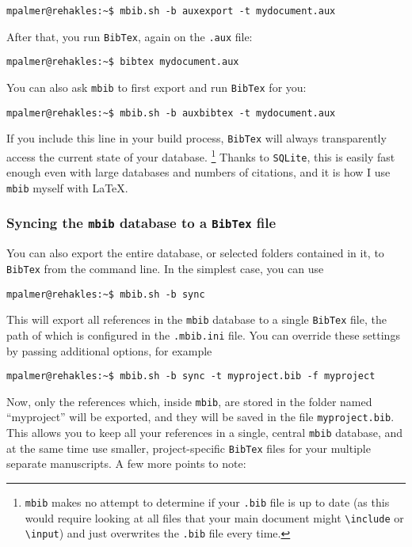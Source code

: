 \documentclass[10pt]{article}
\newcommand*{\mbib}{\texttt{mbib}\xspace}
\newcommand*{\bibtex}{\texttt{BibTex}\xspace}
\newcommand*{\sqlite}{\texttt{SQLite}\xspace}
\newcommand*{\ini}{\texttt{.mbib.ini}\xspace}
\begin{document}
\begin{verbatim}
mpalmer@rehakles:~$ mbib.sh -b auxexport -t mydocument.aux
\end{verbatim}

\noindent After that, you run \bibtex, again on the \texttt{.aux} file:

\begin{verbatim}
mpalmer@rehakles:~$ bibtex mydocument.aux
\end{verbatim}

\noindent You can also ask \mbib to first export and run \bibtex for you:

\begin{verbatim}
mpalmer@rehakles:~$ mbib.sh -b auxbibtex -t mydocument.aux
\end{verbatim}

\noindent If you include this line in your build process, \bibtex will always transparently access the current state of your database.%
%
\footnote{\mbib makes no attempt to determine if your \texttt{.bib} file is up to date (as this would require looking at all files that your main document might \texttt{\textbackslash include} or \texttt{\textbackslash input}) and just overwrites the \texttt{.bib} file every time.}
% 
Thanks to \sqlite, this is easily fast enough even with large databases and numbers of citations, and it is how I use \mbib myself with \LaTeX. 

\subsubsection{Syncing the \mbib database to a \bibtex file}

You can also export the entire database, or selected folders contained in it, to \bibtex from the command line. In the simplest case, you can use 

\begin{verbatim}
mpalmer@rehakles:~$ mbib.sh -b sync
\end{verbatim}

\noindent This will export all references in the \mbib database to a single \bibtex file, the path of which is configured in the \ini file. You can override these settings by passing additional options, for example 

\begin{verbatim}
mpalmer@rehakles:~$ mbib.sh -b sync -t myproject.bib -f myproject
\end{verbatim}

\noindent Now, only the references which, inside \mbib, are stored in the folder named ``myproject'' will be exported, and they will be saved in the file \texttt{myproject.bib}. This allows you to keep all your references in a single, central \mbib database, and at the same time use smaller, project-specific \bibtex files for your multiple separate manuscripts. A few more points to note: 
\end{document}
